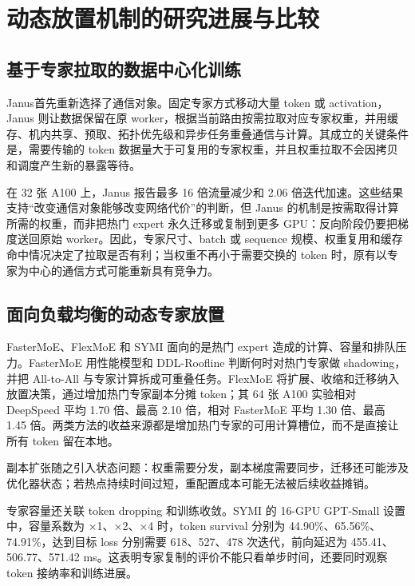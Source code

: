 \section{动态放置机制的研究进展与比较}
\label{sec:research}

\subsection{基于专家拉取的数据中心化训练}

Janus\cite{ref1}首先重新选择了通信对象。固定专家方式移动大量 token 或 activation，Janus 则让数据保留在原 worker，根据当前路由按需拉取对应专家权重，并用缓存、机内共享、预取、拓扑优先级和异步任务重叠通信与计算。其成立的关键条件是，需要传输的 token 数据量大于可复用的专家权重，并且权重拉取不会因拷贝和调度产生新的暴露等待。

在 32 张 A100 上，Janus 报告最多 16 倍流量减少和 2.06 倍迭代加速\cite{ref1}。这些结果支持``改变通信对象能够改变网络代价''的判断，但 Janus 的机制是按需取得计算所需的权重，而非把热门 expert 永久迁移或复制到更多 GPU：反向阶段仍要把梯度送回原始 worker。因此，专家尺寸、batch 或 sequence 规模、权重复用和缓存命中情况决定了拉取是否有利；当权重不再小于需要交换的 token 时，原有以专家为中心的通信方式可能重新具有竞争力。

\subsection{面向负载均衡的动态专家放置}

FasterMoE、FlexMoE 和 SYMI 面向的是热门 expert 造成的计算、容量和排队压力。FasterMoE 用性能模型和 DDL-Roofline 判断何时对热门专家做 shadowing，并把 All-to-All 与专家计算拆成可重叠任务\cite{ref5}。FlexMoE 将扩展、收缩和迁移纳入放置决策，通过增加热门专家副本分摊 token；其 64 张 A100 实验相对 DeepSpeed 平均 1.70 倍、最高 2.10 倍，相对 FasterMoE 平均 1.30 倍、最高 1.45 倍\cite{ref2}。两类方法的收益来源都是增加热门专家的可用计算槽位，而不是直接让所有 token 留在本地。

副本扩张随之引入状态问题：权重需要分发，副本梯度需要同步，迁移还可能涉及优化器状态；若热点持续时间过短，重配置成本可能无法被后续收益摊销。

专家容量还关联 token dropping 和训练收敛。SYMI 的 16-GPU GPT-Small 设置中，容量系数为 ×1、×2、×4 时，token survival 分别为 44.90\%、65.56\%、74.91\%，达到目标 loss 分别需要 618、527、478 次迭代，前向延迟为 455.41、506.77、571.42 ms\cite{ref4}。这表明专家复制的评价不能只看单步时间，还要同时观察 token 接纳率和训练进展。

